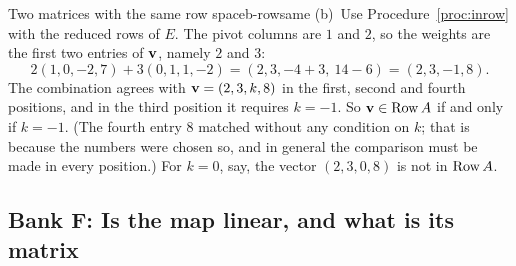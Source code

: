 \documentclass[11pt]{article}
\begin{document}
\begin{exmp}{Two matrices with the same row space}{b-rowsame}
(b)~Use Procedure~\ref{proc:inrow} with the reduced rows of $E$. The pivot columns are $1$ and $2$, so the weights are the first two entries of $\mathbf{v}$, namely $2$ and $3$:
\[
2(1,0,-2,7)+3(0,1,1,-2)=(2,3,-4+3,\ 14-6)=(2,3,-1,8).
\]
The combination agrees with $\mathbf{v}=(2,3,k,8)$ in the first, second and fourth positions, and in the third position it requires $k=-1$. So $\mathbf{v}\in\operatorname{Row} A$ if and only if $k=-1$. (The fourth entry $8$ matched without any condition on $k$; that is because the numbers were chosen so, and in general the comparison must be made in every position.) For $k=0$, say, the vector $(2,3,0,8)$ is not in $\operatorname{Row} A$.
\end{exmp}

\subsection*{Bank F: Is the map linear, and what is its matrix}
\end{document}
